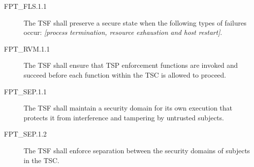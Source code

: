 \documentclass[12pt,english]{scrbook}
\begin{document}



\begin{description}
\item[FPT{\_}FLS.1.1 ]

The TSF shall preserve a secure state when the following types of
failures occur: \emph{{[}process termination, resource
exhaustion and host restart]}.

\end{description}





\begin{description}
\item[FPT{\_}RVM.1.1 ]

The TSF shall ensure that TSP enforcement functions are invoked
and succeed before each function within the TSC is allowed to
proceed.

\end{description}





\begin{description}
\item[FPT{\_}SEP.1.1 ]

The TSF shall maintain a security domain for its own execution that
protects it from interference and tampering by untrusted
subjects.

\item[FPT{\_}SEP.1.2 ]

The TSF shall enforce separation between the
security domains of subjects in the TSC.

\end{description}
\end{document}
